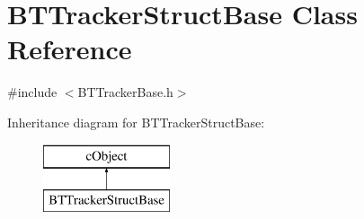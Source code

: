 \hypertarget{classBTTrackerStructBase}{}\section{B\+T\+Tracker\+Struct\+Base Class Reference}
\label{classBTTrackerStructBase}


{\ttfamily \#include $<$B\+T\+Tracker\+Base.\+h$>$}

Inheritance diagram for B\+T\+Tracker\+Struct\+Base\+:\begin{figure}[H]
\begin{center}
\leavevmode
\includegraphics[height=2.000000cm]{classBTTrackerStructBase}
\end{center}
\end{figure}
